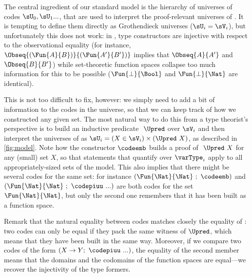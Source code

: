 The central ingredient of our standard model is the hierarchy of universes of
codes \( \sU_0, \sU_1... \), that are used to interpret the proof-relevant universes
of \SetoidCC.
%
It is tempting to define them directly as Grothendieck universes
(\( \sU_i = \sV_i \)), but unfortunately this does not work: in \SetoidCC,
type constructors are injective with respect to the observational equality
(for instance, \( \Obseq{(\Fun{A}{B})}{(\Fun{A'}{B'})} \) implies that
\( \Obseq{A}{A'} \) and \( \Obseq{B}{B'} \)) while set-theoretic function
spaces collapse too much information for this to be possible
(\( \Fun{\bot}{\Bool} \) and \( \Fun{\bot}{\Nat} \) are identical).

This is not too difficult to fix, however: we simply need to add a bit of
information to the codes in the universe, so that we can keep track of how
we constructed any given set. The most natural way to do this from a type
theorist's perspective is to build an inductive predicate \( \ \Upred \) over
\( \sV_i \) and then interpret the universes of \SetoidCC as
\( \sU_i = (X \in \sV_i)\times(\Upred\ X) \), as described in \cref{fig:model}.
%
Note how the constructor \( \codeemb \) builds a proof of \( \ \Upred\ X \)
for any (small) set \( X \), so that statements that quantify over
\( \varType_i \) apply to all appropriately-sized sets of the model.
%
This also implies that there might be several codes for the
same set: for instance \( (\Fun{\Nat}{\Nat} \ ;\ \codeemb) \) and
\( (\Fun{\Nat}{\Nat} \ ;\ \codepiuu\ ...) \) are both codes for
the set \( \Fun{\Nat}{\Nat} \), but only the second one remembers that it
has been built as a function space.

Remark that the natural equality between codes matches closely the equality
of \SetoidCC: two codes can only be equal if they pack the same witness of
\( \Upred \), which means that they have been built in the same way.
Moreover, if we compare two codes of the form
\( (X \to Y ;\ \codepiuu\ ...) \), the equality of the second member means that
the domains and the codomains of the function spaces are equal---we recover the injectivity of
the type formers.

